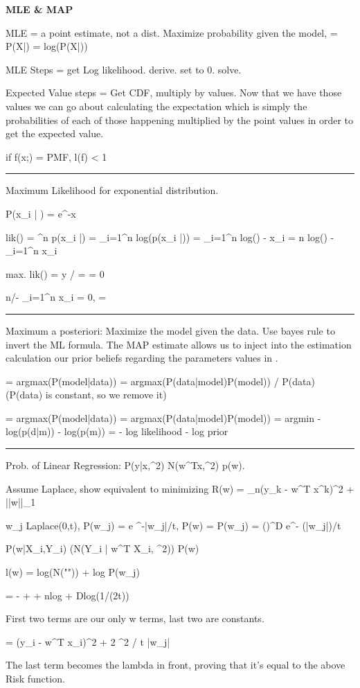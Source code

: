 \documentclass[a4paper,twoside,twocolumn]{article}
\begin{document}
\textbf{MLE \& MAP}

\setlength{\parindent}{0pt}
{\scriptsize
MLE = a point estimate, not a dist. Maximize probability given the model,  = \product P(X|\theta) = \Sigma log(P(X|\theta))

MLE Steps = get Log likelihood. derive. set to 0. solve.

Expected Value steps =  Get CDF, multiply by values. Now that we have those values we can go about calculating the expectation which is simply the probabilities of each of those happening multiplied by the point values in order to get the expected value.

if f(x;\theta) = PMF,  l(f) < 1

\noindent\rule{8cm}{0.4pt}

Maximum Likelihood for exponential distribution.

P(x_i | \theta) = \theta e^{-\theta x}

lik(\theta) = \prod^n p(x_i |\theta) = \sum_{i=1}^n log(p(x_i |\theta)) = \sum_{i=1}^n log(\theta) - \theta x_i = n log(\theta) - \sum_{i=1}^n \theta x_i

max. lik(\theta) = \partial y / \partial \theta =  = 0

n/\theta - \sum_{i=1}^n x_i = 0, \theta = 

\noindent\rule{8cm}{0.4pt}

Maximum a posteriori: Maximize the model given the data. Use bayes rule to invert the ML formula. The MAP estimate allows us to inject into the estimation calculation our prior beliefs regarding the parameters values in \Theta.

= argmax(P(model|data)) = argmax(P(data|model)P(model)) / P(data) (P(data) is constant, so we remove it)

= argmax(P(model|data)) = argmax(P(data|model)P(model)) = argmin -log(p(d|m)) - log(p(m)) = - log likelihood - log prior

\noindent\rule{8cm}{0.4pt}

Prob. of Linear Regression: P(y|x,\sigma^2) \approx N(w^Tx,\sigma^2)  p(w).

Assume Laplace, show equivalent to minimizing R(w) = \Sigma_n(y_k - w^T x^k)^2 + \lambda ||w||_1

w_j \approx Laplace(0,t), P(w_j) =  e ^{-|w_j|/t}, P(w) = \product P(w_j) = ()^D \cdot e^{- (\Sigma|w_j|)/t}

P(w|X_i,Y_i) \propto (\prod N(Y_i | w^T X_i, \sigma^2)) \cdot P(w)

l(w) = \Sigma log(N("")) + \Sigma log P(w_j)

= - \Sigma {} +  + nlog  + Dlog(1/(2t))

First two terms are our only w terms, last two are constants.

= \Sigma(y_i - w^T x_i)^2 + 2 \sigma^2 / t \Sigma |w_j|

The last term becomes the lambda in front, proving that it's equal to the above Risk function.

}
\end{document}
